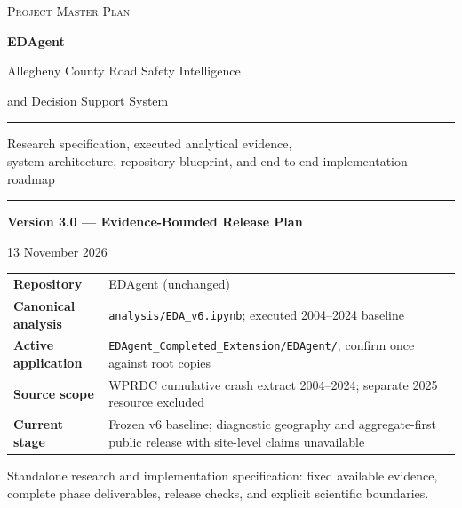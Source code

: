 \documentclass[11pt,a4paper,openany]{report}
\newcommand{\pathcode}[1]{\nolinkurl{#1}}
\begin{document}
\begin{titlepage}
\centering
\vspace*{22mm}
{\large\scshape Project Master Plan\par}
\vspace{13mm}
{\Huge\bfseries EDAgent\par}
\vspace{6mm}
{\Large Allegheny County Road Safety Intelligence\par}
{\Large and Decision Support System\par}
\vspace{15mm}
\rule{.79\textwidth}{.6pt}\par\vspace{9mm}
{\large Research specification, executed analytical evidence,\\system architecture, repository blueprint, and end-to-end implementation roadmap\par}
\vspace{10mm}\rule{.79\textwidth}{.6pt}\par
\vspace{16mm}
{\Large\bfseries Version 3.0 --- Evidence-Bounded Release Plan\par}
\vspace{3mm}
{\normalsize 13 November 2026\par}
\vfill
\begin{minipage}{.87\textwidth}
\begin{tabularx}{\linewidth}{@{}L{40mm}Y@{}}
\textbf{Repository} & EDAgent (unchanged)\\
\textbf{Canonical analysis} & \pathcode{analysis/EDA_v6.ipynb}; executed 2004--2024 baseline\\
\textbf{Active application} & \pathcode{EDAgent_Completed_Extension/EDAgent/}; confirm once against root copies\\
\textbf{Source scope} & WPRDC cumulative crash extract 2004--2024; separate 2025 resource excluded\\
\textbf{Current stage} & Frozen v6 baseline; diagnostic geography and aggregate-first public release with site-level claims unavailable\\
\end{tabularx}
\end{minipage}\par
\vspace{14mm}
{\small Standalone research and implementation specification: fixed available evidence, complete phase deliverables, release checks, and explicit scientific boundaries.}
\end{titlepage}
\end{document}
